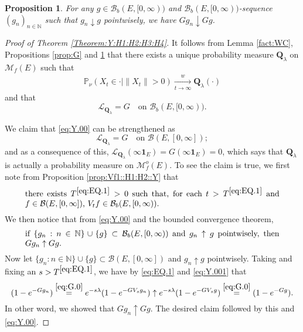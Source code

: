 \documentclass[12pt,a4paper]{amsart}
\numberwithin{equation}{section}
\theoremstyle{plain}
\newtheorem{prop}[thm]{Proposition}
\theoremstyle{definition}
\theoremstyle{remark}
\begin{document}
\begin{prop} \label{prop::GD:H1:H2:H3:H4::Y}
	For any $g\in \mathcal B_b(E,[0,\infty))$ and $\mathcal B_b(E,[0,\infty))$-sequence $(g_n)_{n\in \mathbb N}$ such that $g_n \downarrow g$ pointwisely,
	we have $G g_n \downarrow Gg$.
\end{prop}

\begin{proof}[Proof of Theorem \ref{Theorem:Y:H1:H2:H3:H4}]
	It follows from Lemma \ref{fact:WC}, Propositions \ref{prop:G} and \ref{prop::GD:H1:H2:H3:H4::Y} that there exists a unique probability measure $\mathbf Q_\lambda$ on $\mathcal M_f(E)$ such that
\begin{align}\label{eq:Y.0}
 	\mathbb P_{\nu}(X_t \in \cdot | \|X_t\|>0 )
\xrightarrow[t\to \infty]{w} \mathbf Q_\lambda(\cdot)
\end{align}
	and that
\begin{equation} \label{eq:Y.00}
	\mathscr L_{\mathbf Q_\lambda} = G \quad \mbox{on } \mathcal B_b(E,[0,\infty)).
\end{equation}

	We claim that \eqref{eq:Y.00} can be strengthened as
\begin{equation} \label{eq:Y.000}
	\mathscr L_{\mathbf Q_\lambda} 
	= G \quad \mbox{on } \mathcal B(E,[0,\infty]);
\end{equation}
	and as a consequence of this, $\mathscr L_{\mathbf Q_\lambda}(\infty \mathbf 1_E) = G(\infty \mathbf 1_E)= 0$, which says that $\mathbf Q_\lambda$ is actually a probability measure on $\mathcal M_f^o(E)$.
	To see the claim is true, we first note from Proposition \ref{prop:Vf1::H1:H2::Y} that
\begin{equation} \label{eq:EQ.1} \begin{minipage}{0.9\textwidth}
	there exists $T^{\eqref{eq:EQ.1}}>0$ such that, for each $t>T^{\eqref{eq:EQ.1}}$ and $f\in \mathcal B(E,[0,\infty])$, $V_tf \in \mathcal B_b(E,[0,\infty))$.
\end{minipage} \end{equation}
	 We then notice that from \eqref{eq:Y.00} and the bounded convergence theorem, 
\begin{equation} \label{eq:Y.001}
\begin{minipage}{0.9\textwidth}
	if $\{g_n:n\in \mathbb N\} \cup \{g\} \subset \mathcal B_b(E,[0,\infty))$ and $g_n \uparrow g$ pointwisely, then $Gg_n \uparrow Gg$.
\end{minipage}
\end{equation}
	Now let $\{g_n:n\in \mathbb N\} \cup \{g\} \subset \mathcal B(E,[0,\infty])$ and $g_n \uparrow g$ pointwisely. 
	Taking and fixing an $s > T^{\eqref{eq:EQ.1}}$, we have by \eqref{eq:EQ.1} and \eqref{eq:Y.001} that
\[
	(1 - e^{-G g_n}) 
	\overset{\eqref{eq:G.0}} = e^{- s\lambda } (1 - e^{- G V_s g_n}) 
	\uparrow e^{- s\lambda } (1 - e^{- G V_s g}) 
	\overset{\eqref{eq:G.0}} =(1 - e^{-G g}).
\]
	In other word, we showed that $Gg_n \uparrow Gg$. 
	The desired claim followed by this and \eqref{eq:Y.00}. 


\end{proof}
\end{document}
